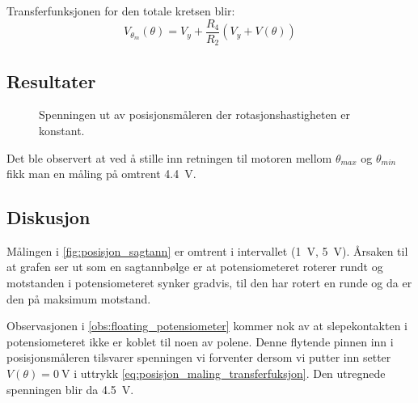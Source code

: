Transferfunksjonen for den totale kretsen blir:
\begin{equation}
    \label{eq:posisjon_maling_transferfuksjon}
    V_{\theta_m}(\theta) = V_y + \frac{R_4}{R_2}(V_y + V(\theta))
\end{equation}







\subsection{Resultater}

\begin{figure}[h]
    \centering
    
    \caption{Spenningen ut av posisjonsmåleren der rotasjonshastigheten er konstant.}
    \label{fig:posisjon_sagtann}
\end{figure}

\label{obs:floating_potensiometer}
Det ble observert at ved å stille inn retningen til motoren mellom $\theta_{max}$ og $\theta_{min}$ fikk man en måling på omtrent \SI{4.4}{\volt}.








\subsection{Diskusjon}

Målingen i \autoref{fig:posisjon_sagtann} er omtrent i intervallet (\SI{1}{\volt}, \SI{5}{\volt}). Årsaken til at grafen ser ut som en sagtannbølge er at potensiometeret roterer rundt og motstanden i potensiometeret synker gradvis, til den har rotert en runde og da er den på maksimum motstand.


Observasjonen i \ref{obs:floating_potensiometer} kommer nok av at slepekontakten i potensiometeret ikke er koblet til noen av polene. Denne flytende pinnen inn i posisjonsmåleren tilsvarer spenningen vi forventer dersom vi putter inn setter $V(\theta) = \SI{0}{\volt}$ i uttrykk \eqref{eq:posisjon_maling_transferfuksjon}. Den utregnede spenningen blir da \SI{4.5}{\volt}.
